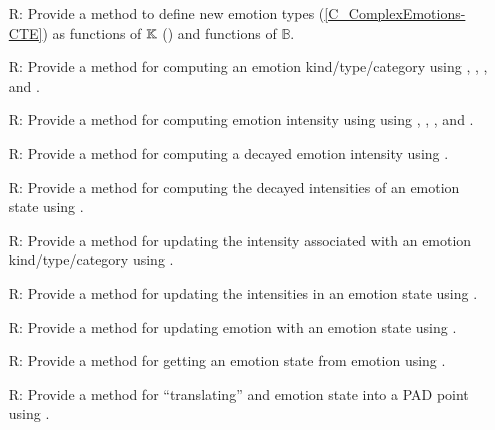 \begin{itemize}
    \item[R\refstepcounter{reqnum}\thereqnum \label{R_MixingEmotionsCTE}:]
    Provide a method to define new emotion types (\cref{C_ComplexEmotions-CTE})
    as functions of $\mathbb{K}$ () and functions
    of $\mathbb{B}$.

    \item[R\refstepcounter{reqnum}\thereqnum \label{R_GenerateEmotionCTE}:]
    Provide a method for computing an emotion kind/type/category using
    , ,
    , and
    .

    \item[R\refstepcounter{reqnum}\thereqnum \label{R_CalculateIntensity}:]
    Provide a method for computing emotion intensity using using
    , ,
    , and
    .

    \item[R\refstepcounter{reqnum}\thereqnum \label{R_DecayIntensity}:] Provide
    a method for computing a decayed emotion intensity using
    .

    \item[R\refstepcounter{reqnum}\thereqnum \label{R_DecayEmotion}:] Provide a
    method for computing the decayed intensities of an emotion state using
    .

    \item[R\refstepcounter{reqnum}\thereqnum \label{R_UpdateAnIntensity}:]
    Provide a method for updating the intensity associated with an emotion
    kind/type/category using .

    \item[R\refstepcounter{reqnum}\thereqnum \label{R_UpdateEmotionState}:]
    Provide a method for updating the intensities in an emotion state using
    .

    \item[R\refstepcounter{reqnum}\thereqnum \label{R_UpdateEmotion}:] Provide
    a method for updating emotion with an emotion state using
    .

    \item[R\refstepcounter{reqnum}\thereqnum \label{R_GetEmotionState}:]
    Provide a method for getting an emotion state from emotion using
    .

    \item[R\refstepcounter{reqnum}\thereqnum \label{R_Convert2PAD}:] Provide a
    method for ``translating'' and emotion state into a PAD point using
    .

\end{itemize}